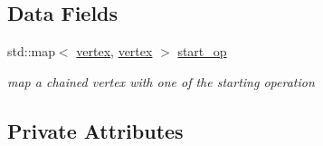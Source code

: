 \subsection*{Data Fields}
\begin{DoxyCompactItemize}
\item 
std\+::map$<$ \hyperlink{graph_8hpp_abefdcf0544e601805af44eca032cca14}{vertex}, \hyperlink{graph_8hpp_abefdcf0544e601805af44eca032cca14}{vertex} $>$ \hyperlink{classliveness_a7902dde24769965a1d02782faed9bdd2}{start\+\_\+op}
\begin{DoxyCompactList}\small\item\em map a chained vertex with one of the starting operation \end{DoxyCompactList}\end{DoxyCompactItemize}
\subsection*{Private Attributes}
